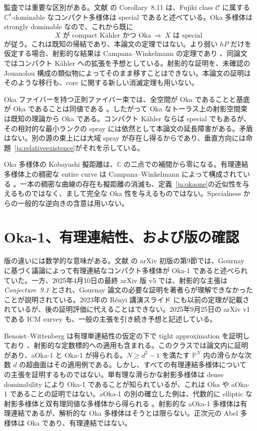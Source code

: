 \documentclass[12pt]{amsart}
\theoremstyle{definition}
\theoremstyle{remark}
\numberwithin{equation}{section}
\newcommand{\C}{\mathbb{C}}
\newcommand{\mP}{\mathbb{P}}
\begin{document}
監査では重要な区別がある。文献 \cite{ja:Campana} の Corollary~8.11 は、Fujiki class $\mathcal C$ に属する $\C^d$-dominable なコンパクト多様体は special であると述べている。Oka 多様体は strongly dominable なので、これから既に
\[
X\text{ が compact K\"ahler かつ Oka}\ \Longrightarrow\ X\text{ は special}
\]
が従う。これは既知の帰結であり、本論文の定理ではない。より弱い $hP$ だけを仮定する場合、射影的な結果は Campana--Winkelmann の定理であり \cite{ja:CWhP}、同論文ではコンパクト K\"ahler への拡張を予想としている。射影的な証明を、未確認の Jouanolou 構成の類似物によってそのまま移すことはできない。本論文の証明はそのような移行も、core に関する新しい消滅定理も用いない。

Oka ファイバーを持つ正則ファイバー束では、全空間が Oka であることと基底が Oka であることは同値である \cite{ja:Book}。したがって Oka なトーラス上の射影空間束は既知の理論から Oka である。コンパクト K\"ahler ならば special でもあるが、その相対的な最小ランクの spray には依然として本論文の延長障害がある。矛盾はない。別の源の束上には大域 spray が存在し得るからであり、垂直方向には命題~\ref{ja:relativeexistence}がそれを示している。

Oka 多様体の Kobayashi 擬距離は、$\C$ の二点での補間から零になる。有理連結多様体上の稠密な entire curve は Campana--Winkelmann によって構成されている \cite{ja:CWdense}。一本の稠密な曲線の存在も擬距離の消滅も、定義~\ref{ja:okaone}の近似性を与えるものではなく、まして完全な Oka 性を与えるものではない。Specialness からの一般的な逆向きの含意は用いない。

\section{Oka-1、有理連結性、および版の確認}\label{ja:versions}
版の違いには数学的な意味がある。文献 \cite{ja:AF} の arXiv 初版の第9節では、Gournay \cite{ja:Gournay} に基づく議論によって有理連結なコンパクト多様体が Oka-1 であると述べられていた。一方、2025年4月10日の最終 arXiv 版 v5 では、射影的な主張は \emph{Conjecture~9.1} とされ、Gournay 論文の必要な証明を著者らが理解できなかったことが説明されている。2023年の R\'enyi 講演スライド \cite{ja:Slides} にも以前の定理が記載されているが、後の証明評価に代えることはできない。2025年9月25日の arXiv v1 である ICM survey \cite{ja:ICM} も、一般の主張を引き続き予想と記述している。

Benoist--Wittenberg は有理単連結性の仮定の下で tight approximation を証明しており \cite{ja:BW}、射影的な定数標的への適用も含まれる。このクラスでは論文内に証明があり、aOka-1 と Oka-1 が得られる。$N\geq d^2-1$ を満たす $\mP^N$ 内の滑らかな次数 $d$ の超曲面はその適用例である。しかし、すべての有理連結多様体についての主張を証明するものではない。単有理な滑らかな射影多様体は dense dominability により Oka-1 であることが知られているが、これは Oka や aOka-1 であることの証明ではない。aOka-1 の別の確立した例は、代数的に elliptic な射影多様体と双有理同値な多様体から得られる \cite[Theorem~1.6 and Remark~1.10]{ja:FLone}。射影的な aOka-1 多様体は有理連結であるが、解析的な Oka 多様体はそうとは限らない。正次元の Abel 多様体は Oka であり、有理連結ではない。
\end{document}
